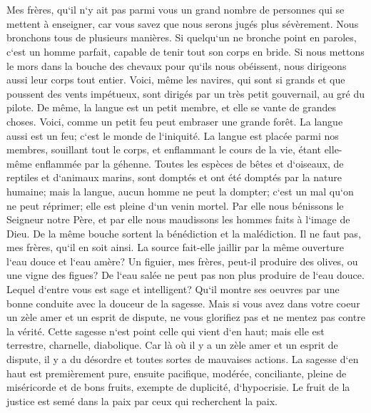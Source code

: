 \chapter{}

\verse Mes frères, qu`il n`y ait pas parmi vous un grand nombre de personnes qui se mettent à enseigner, car vous savez que nous serons jugés plus sévèrement. 
\verse Nous bronchons tous de plusieurs manières. Si quelqu`un ne bronche point en paroles, c`est un homme parfait, capable de tenir tout son corps en bride. 
\verse Si nous mettons le mors dans la bouche des chevaux pour qu`ils nous obéissent, nous dirigeons aussi leur corps tout entier. 
\verse Voici, même les navires, qui sont si grands et que poussent des vents impétueux, sont dirigés par un très petit gouvernail, au gré du pilote. 
\verse De même, la langue est un petit membre, et elle se vante de grandes choses. Voici, comme un petit feu peut embraser une grande forêt. 
\verse La langue aussi est un feu; c`est le monde de l`iniquité. La langue est placée parmi nos membres, souillant tout le corps, et enflammant le cours de la vie, étant elle-même enflammée par la géhenne. 
\verse Toutes les espèces de bêtes et d`oiseaux, de reptiles et d`animaux marins, sont domptés et ont été domptés par la nature humaine; 
\verse mais la langue, aucun homme ne peut la dompter; c`est un mal qu`on ne peut réprimer; elle est pleine d`un venin mortel. 
\verse Par elle nous bénissons le Seigneur notre Père, et par elle nous maudissons les hommes faits à l`image de Dieu. 
\verse De la même bouche sortent la bénédiction et la malédiction. Il ne faut pas, mes frères, qu`il en soit ainsi. 
\verse La source fait-elle jaillir par la même ouverture l`eau douce et l`eau amère? 
\verse Un figuier, mes frères, peut-il produire des olives, ou une vigne des figues? De l`eau salée ne peut pas non plus produire de l`eau douce. 
\verse Lequel d`entre vous est sage et intelligent? Qu`il montre ses oeuvres par une bonne conduite avec la douceur de la sagesse. 
\verse Mais si vous avez dans votre coeur un zèle amer et un esprit de dispute, ne vous glorifiez pas et ne mentez pas contre la vérité. 
\verse Cette sagesse n`est point celle qui vient d`en haut; mais elle est terrestre, charnelle, diabolique. 
\verse Car là où il y a un zèle amer et un esprit de dispute, il y a du désordre et toutes sortes de mauvaises actions. 
\verse La sagesse d`en haut est premièrement pure, ensuite pacifique, modérée, conciliante, pleine de miséricorde et de bons fruits, exempte de duplicité, d`hypocrisie. 
\verse Le fruit de la justice est semé dans la paix par ceux qui recherchent la paix. 

